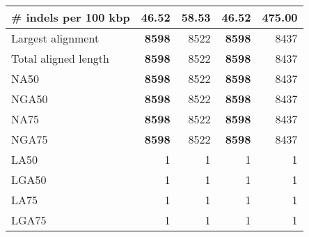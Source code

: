 \documentclass[12pt,a4paper]{article}
\begin{document}
\begin{table}[ht]
\begin{center}
\begin{tabular}{|l*{4}{|r}|}
\# indels per 100 kbp & {\bf 46.52} & 58.53 & {\bf 46.52} & 475.00 \\ \hline
Largest alignment & {\bf 8598} & 8522 & {\bf 8598} & 8437 \\ \hline
Total aligned length & {\bf 8598} & 8522 & {\bf 8598} & 8437 \\ \hline
NA50 & {\bf 8598} & 8522 & {\bf 8598} & 8437 \\ \hline
NGA50 & {\bf 8598} & 8522 & {\bf 8598} & 8437 \\ \hline
NA75 & {\bf 8598} & 8522 & {\bf 8598} & 8437 \\ \hline
NGA75 & {\bf 8598} & 8522 & {\bf 8598} & 8437 \\ \hline
LA50 & 1 & 1 & 1 & 1 \\ \hline
LGA50 & 1 & 1 & 1 & 1 \\ \hline
LA75 & 1 & 1 & 1 & 1 \\ \hline
LGA75 & 1 & 1 & 1 & 1 \\ \hline
\end{tabular}
\end{center}
\end{table}
\end{document}
